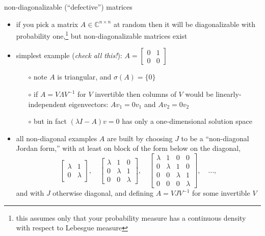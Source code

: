 \documentclass[10pt,hyperref]{beamer}
\newcommand{\CC}{\mathbb{C}}
\begin{document}
\begin{frame}{non-diagonalizable (``defective'') matrices}

\begin{itemize}
\item if you pick a matrix $A\in\CC^{n\times n}$ at random then it will be diagonalizable with probability one,\footnote{\tiny this assumes only that your probability measure has a continuous density with respect to Lebesgue measure} but non-diagonalizable matrices exist
\item simplest example (\emph{check all this!}): \quad $A = \begin{bmatrix} 0 & 1 \\ 0 & 0 \end{bmatrix}$
    \begin{itemize}
    \item[$\circ$] note $A$ is triangular, and $\sigma(A) = \{0\}$
    \item[$\circ$] if $A=V\Lambda V^{-1}$ for $V$ invertible then columns of $V$ would be linearly-independent eigenvectors: $Av_1=0v_1$ and $Av_2=0v_2$
    \item[$\circ$] but in fact $(\lambda I - A) v = 0$ has only a one-dimensional solution space
    \end{itemize}
\item all non-diagonal examples $A$ are built by choosing $J$ to be a ``non-diagonal Jordan form,'' with at least on block of the form below on the diagonal,
\footnotesize
    $$\begin{bmatrix} \lambda & 1 \\ 0 & \lambda \end{bmatrix}, \quad \begin{bmatrix} \lambda & 1 & 0 \\ 0 & \lambda & 1 \\ 0 & 0 & \lambda \end{bmatrix}, \quad \begin{bmatrix} \lambda & 1 & 0 & 0 \\ 0 & \lambda & 1 & 0 \\ 0 & 0 & \lambda & 1 \\ 0 & 0 & 0 & \lambda \end{bmatrix}, \quad \dots,$$
\normalsize
and with $J$ otherwise diagonal, and defining $A=VJV^{-1}$ for some invertible $V$
\end{itemize}
\end{frame}
\end{document}
